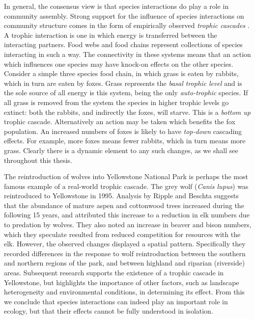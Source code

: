 
In general, the consensus view is that species interactions do play a role in community assembly. Strong support for the influence of species interactions on community structure comes in the form of empirically observed \emph{trophic cascades} \cite{knight2005trophic,ripple2012trophic}. A trophic interaction is one in which energy is transferred between the interacting partners. Food webs and food chains represent collections of species interacting in such a way. The connectivity in these systems means that an action which influences one species may have knock-on effects on the other species. Consider a simple three species food chain, in which grass is eaten by rabbits, which in turn are eaten by foxes. Grass represents the \emph{basal trophic level} and is the sole source of all energy is this system, being the only \emph{auto-trophic} species. If all grass is removed from the system the species in higher trophic levels go extinct: both the rabbits, and indirectly the foxes, will starve. This is a \emph{bottom up} trophic cascade. Alternatively an action may be taken which benefits the fox population. An increased numbers of foxes is likely to have \emph{top-down} cascading effects. For example, more foxes means fewer rabbits, which in turn means more grass. Clearly there is a dynamic element to any such changes, as we shall see throughout this thesis. 

The reintroduction of wolves into Yellowstone National Park is perhaps the most famous example of a real-world trophic cascade. The grey wolf (\emph{Canis lupus}) was reintroduced to Yellowstone in 1995. Analysis by Ripple and Beschta  \cite{ripple2012trophic} suggests that the abundance of mature aspen and cottonwood trees increased during the following 15 years, and attributed this increase to a reduction in elk numbers due to predation by wolves. They also noted an increase in beaver and bison numbers, which they speculate resulted from reduced competition for resources with the elk. However, the observed changes displayed a spatial pattern. Specifically they recorded differences in the response to wolf reintroduction between the southern and northern regions of the park, and between highland and riparian (riverside) areas. Subsequent research \cite{marshall2014interactions} supports the existence of a trophic cascade in Yellowstone, but highlights the importance of other factors, such as landscape heterogeneity and environmental conditions, in determining its effect. From this we conclude that species interactions can indeed play an important role in ecology, but that their effects cannot be fully understood in isolation.

